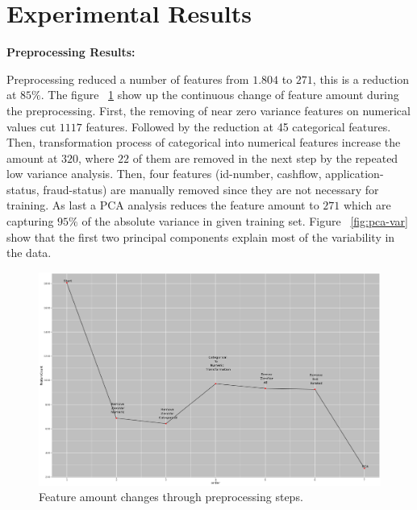 \section{Experimental Results}\label{Chapter:5:Results}

\textbf{Preprocessing Results:}

Preprocessing reduced a number of features from \(1.804\) to \(271\), this is a reduction at \(85\%\). 
The figure ~\ref{fig:features-preprocessing} show up the continuous change of feature amount during the preprocessing. First, the removing of near zero variance features on numerical values cut \(1117\) features. Followed by the reduction at 45 categorical features. Then, transformation process of categorical into numerical features increase the amount at \(320\), where \(22\) of them are removed in the next step by the repeated low variance analysis. Then, four features (id-number, cashflow, application-status, fraud-status) are manually removed since they are not necessary for training. As last a PCA analysis reduces the feature amount to \(271\) which are capturing \(95 \%\) of the absolute variance in given training set. Figure ~\ref{fig:pca-var} show that the first two principal components explain most of the variability in the data.

\begin{figure}[h!]
    \centering
    \includegraphics[scale=0.25]{Graphics/preprocessing-features.png}
    \caption{Feature amount changes through preprocessing steps.}
    \label{fig:features-preprocessing}
\end{figure}

